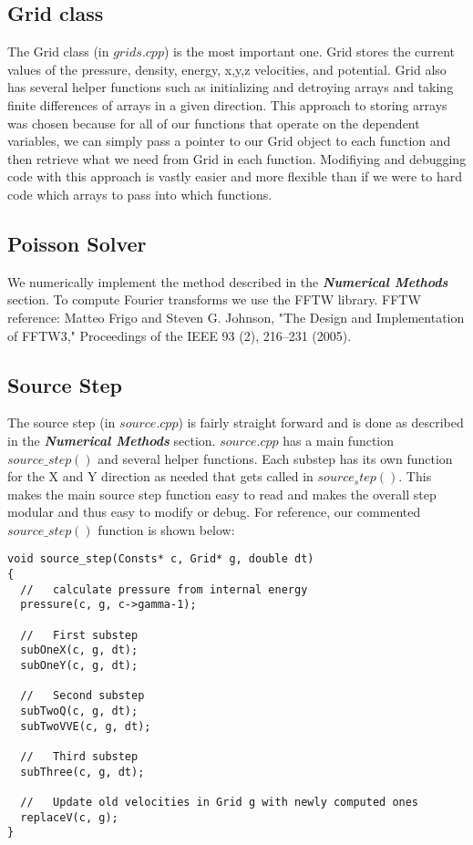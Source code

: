 \subsection{Grid class}
The Grid class (in $grids.cpp$) is the most important one.  Grid stores the current values of the pressure, density, energy, x,y,z velocities, and potential. Grid also has several helper functions such as initializing and detroying arrays and taking finite differences of arrays in a given direction. This approach to storing arrays was chosen because for all of our functions that operate on the dependent variables, we can simply pass a pointer to our Grid object to each function and then retrieve what we need from Grid in each function. Modifiying and debugging code with this approach is vastly easier and more flexible than if we were to hard code which arrays to pass into which functions.
\subsection{Poisson Solver}
We numerically implement the method described in the {\bf \it Numerical Methods} section. To compute Fourier transforms we use the FFTW library. FFTW reference: Matteo Frigo and Steven G. Johnson, "The Design and Implementation of FFTW3," Proceedings of the IEEE 93 (2), 216–231 (2005).
\subsection{Source Step}
The source step (in $source.cpp$) is fairly straight forward and is done as described in the {\bf \it Numerical Methods} section. $source.cpp$ has a main function $source\_step()$ and several helper functions. Each substep has its own function for the X and Y direction as needed that gets called in $source_step()$. This makes the main source step function easy to read and makes the overall step modular and thus easy to modify or debug. For reference, our commented $source\_step()$ function is shown below:

\begin{verbatim}
void source_step(Consts* c, Grid* g, double dt)
{
  //   calculate pressure from internal energy
  pressure(c, g, c->gamma-1);

  //   First substep
  subOneX(c, g, dt);
  subOneY(c, g, dt);

  //   Second substep
  subTwoQ(c, g, dt);
  subTwoVVE(c, g, dt);

  //   Third substep
  subThree(c, g, dt);

  //   Update old velocities in Grid g with newly computed ones
  replaceV(c, g);
}

\end{verbatim}
